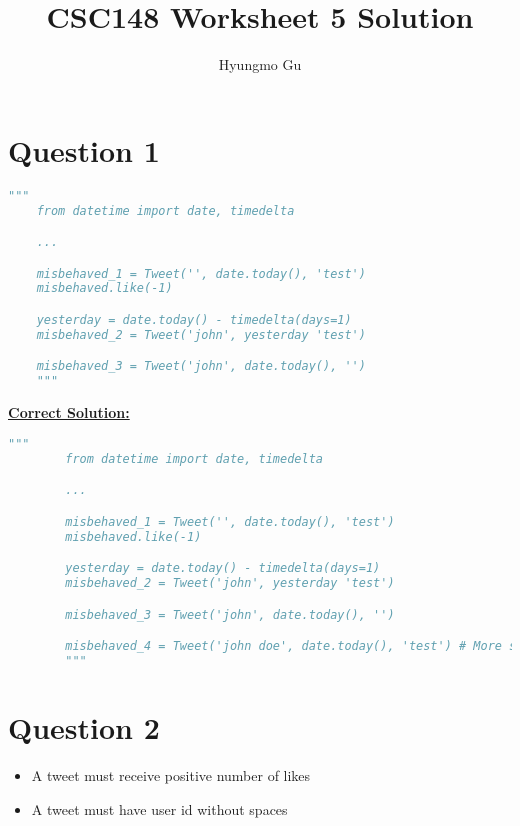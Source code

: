 \documentclass[12pt]{article}
\begin{document}
\title{CSC148 Worksheet 5 Solution}
\author{Hyungmo Gu}
\maketitle

\section*{Question 1}

\begin{lstlisting}[language=Python]
    """
    from datetime import date, timedelta

    ...

    misbehaved_1 = Tweet('', date.today(), 'test')
    misbehaved.like(-1)

    yesterday = date.today() - timedelta(days=1)
    misbehaved_2 = Tweet('john', yesterday 'test')

    misbehaved_3 = Tweet('john', date.today(), '')
    """
\end{lstlisting}

\bigskip

\begin{mdframed}
    \underline{\textbf{Correct Solution:}}

    \bigskip

    \begin{lstlisting}[language=Python]
        """
        from datetime import date, timedelta

        ...

        misbehaved_1 = Tweet('', date.today(), 'test')
        misbehaved.like(-1)

        yesterday = date.today() - timedelta(days=1)
        misbehaved_2 = Tweet('john', yesterday 'test')

        misbehaved_3 = Tweet('john', date.today(), '')

        misbehaved_4 = Tweet('john doe', date.today(), 'test') # More solution!!
        """
    \end{lstlisting}

\end{mdframed}

\section*{Question 2}
\begin{itemize}
    \item A tweet must receive positive number of likes
    \item A tweet must have user id without spaces
\end{itemize}
\end{document}
